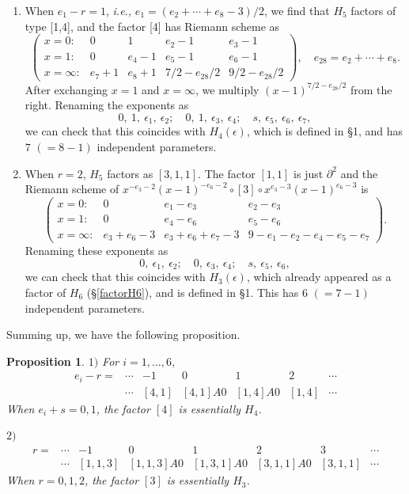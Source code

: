 \documentclass[a4paper,12pt]{article}
\newtheorem{prp}[thm]{Proposition}
\theoremstyle{definition}
\theoremstyle{remark}
\numberwithin{equation}{section} %
\begin{document}
\begin{enumerate}[leftmargin=*]
  \renewcommand{\labelenumi}{\arabic{enumi})}
\item When $e_1-r=1$, {\it i.e.,} $e_1=(e_2+\cdots+ e_8-3)/2$,
  we find that $H_5$ factors of type [1,4],
  and the factor [4] has Riemann scheme as
   $$\left(\begin{array}{ccccc}
x=0:&  0 &1 &e_2-1  &e_3-1\\
x=1:&  0 &e_4-1 &e_5-1&e_6-1\\
x=\infty:&  e_7+1&e_8+1&7/2-e_{28}/2&9/2-e_{28}/2\end{array}\right),\quad e_{28}=e_2+\cdots+e_8.$$
After exchanging $x=1$ and $x=\infty$,
we multiply $(x-1)^{7/2-e_{28}/2}$ from the right. Renaming the exponents as
  $$0,\ 1,\ \epsilon_1,\ \epsilon_2;\quad0,\ 1,\ \epsilon_3,\ \epsilon_4;\quad s,\ \epsilon_5,\ \epsilon_6,\ \epsilon_7,$$
we can check that this coincides with $H_4(\epsilon)$,
which is defined in \S 1, %
and has $7$ $(=8-1)$ independent parameters.
\medskip

\item When $r=2$, $H_5$ factors as $[3,1,1]$. The factor $[1,1]$ is
  just $\partial^2$ and the Riemann scheme of
  $x^{-e_3-2}(x-1)^{-e_6-2}\circ[3]\circ x^{e_3-3}(x-1)^{e_6-3}$ is
  $$\left(\begin{array}{cccc}
x=0:&  0  &e_1-e_3  &e_2-e_3\\
x=1:&  0  &e_4-e_6  &e_5-e_6\\
x=\infty:&  e_3+e_6-3 &e_3+e_6+e_7-3& 9-e_1-e_2-e_4-e_5-e_7\end{array}\right).$$
   Renaming these exponents as 
  $$0,\ \epsilon_1,\ \epsilon_2;\quad 0,\ \epsilon_3,\ \epsilon_4;\quad s,\ \epsilon_5,\ \epsilon_6,$$
   we can check that this coincides with $H_3(\epsilon)$,
   which already appeared as a factor of $H_6$ (\S\ref{factorH6}), 
   and is defined in \S 1. This has $6$ $(=7-1)$ independent parameters.
\end{enumerate}

\noindent Summing up, we have the following proposition.
\begin{prp}\label{factorE5} $1)$ For $i=1,\dots,6$, 
  $$\begin{array}{ccccccc}
    e_i-r= &\cdots&-1&0      &    1  &2&\cdots\\
    & \cdots&[4,1] &[4,1]A0&[1,4]A0&[1,4] &\cdots
  \end{array}$$
  When $e_i+s=0,1$, the factor $[4]$ is {essentially} $H_4$.
    \par\noindent
 $2)$   $$\begin{array}{cccccccc}
    r=& \cdots&-1    & 0&     1&2&3&\cdots\\
    &\cdots&[1,1,3] &[1,1,3]A0&[1,3,1]A0&[3,1,1]A0&[3,1,1]
    &\cdots\end{array}$$
    When $r=0,1,2$, the factor $[3]$ is {essentially} $H_3$.%
\end{prp}
\end{document}
